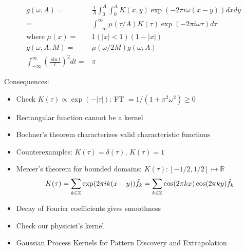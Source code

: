 \documentclass[twoside,11pt]{article}
\numberwithin{equation}{section}
\begin{document}
%
\begin{align*}
    g(\omega, A) ={}& \frac{1}{A} \int_0^A \int_0^A K(x, y) \exp(-2 \pi i \omega (x - y)) dx dy \\
        ={}& \int_{-\infty}^\infty \mu(\tau / A) K(\tau) \exp(-2 \pi i \omega \tau) d\tau \\
\textrm{where }    \mu(x) ={}& 1(|x| < 1)(1 - |x|) \\
    g(\omega, A, M) ={}& \mu(\omega / 2M) g(\omega, A) \\
    \int_{-\infty}^\infty \left(\frac{\sin t}{t}\right)^2 dt ={}& \pi
\end{align*}
%

Consequences:
%
\begin{itemize}
    \item Check $K(\tau) \propto \exp(-|\tau|)$: FT $ = 1 / (1 + \pi^2 \omega^2) \ge 0$
    \item Rectangular function cannot be a kernel
    \item Bochner's theorem characterizes valid characteristic functions
    \item Counterexamples: $K(\tau) = \delta(\tau)$, $K(\tau) = 1$
    \item Mercer's theorem for bounded domains: $K(\tau): [-1/2,1/2] \mapsto \mathbb{R}$
    \begin{align*}
        K(\tau) = 
            \sum_{k \in \mathbb{Z}} \exp(2 \pi i k (x - y)) \hat{f}_k = 
            \sum_{k \in \mathbb{Z}} \cos(2 \pi k x) \cos(2 \pi k y) \hat{f}_k
    \end{align*}
    \item Decay of Fourier coefficients gives smoothness
    \item Check our physicist's kernel
    \item Gaussian Process Kernels for Pattern Discovery and Extrapolation
\end{itemize}
\end{document}
